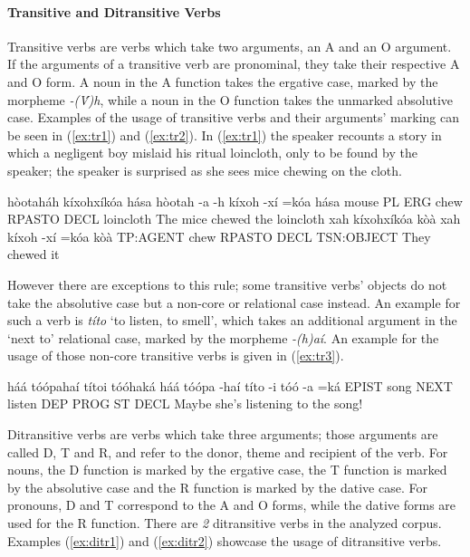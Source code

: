 \documentclass[a4paper, 12pt, oneside]{memoir}
\newcommand{\emh}[1]{\textit{#1}}
\begin{document}
\paragraph{Transitive and Ditransitive Verbs}\label{s:trans}
Transitive verbs are verbs which take two arguments, an A and an O argument. If the arguments of a transitive verb are pronominal, they take their respective A and O form. A noun in the A function takes the ergative case, marked by the morpheme \emh{-(V́)h}, while a noun in the O function takes the unmarked absolutive case. Examples of the usage of transitive verbs and their arguments' marking can be seen in (\ref{ex:tr1}) and (\ref{ex:tr2}). In (\ref{ex:tr1}) the speaker recounts a story in which a negligent boy mislaid his ritual loincloth, only to be found by the speaker; the speaker is surprised as she sees mice chewing on the cloth.
\begin{examples}
    \ex \label{ex:tr1}
    \words hòotaháh kíxohxíkóa hása
    \bits hòotah -a -h kíxoh -xí =kóa hása 
    \gloss mouse PL ERG chew RPASTO DECL loincloth
    \tr The mice chewed the loincloth
    \ex \label{ex:tr2}
    \words xah kíxohxíkóa kòà
    \bits xah kíxoh -xí =kóa kòà
    \gloss TP:AGENT chew RPASTO DECL TSN:OBJECT
    \tr They chewed it
\end{examples} 
However there are exceptions to this rule; some transitive verbs' objects do not take the absolutive case but a non-core or relational case instead. An example for such a verb is \emh{títo} `to listen, to smell', which takes an additional argument in the `next to' relational case, marked by the morpheme \emh{-(h)aí}. An example for the usage of those non-core transitive verbs is given in (\ref{ex:tr3}).
\begin{examples}
    \ex \label{ex:tr3}
    \words háá tóópahaí títoi tóóhaká
    \bits háá tóópa -haí títo -i tóó -a =ká 
    \gloss EPIST song NEXT listen DEP PROG ST DECL
    \tr Maybe she's listening to the song!
\end{examples}
Ditransitive verbs are verbs which take three arguments; those arguments are called D, T and R, and refer to the donor, theme and recipient of the verb. For nouns, the D function is marked by the ergative case, the T function is marked by the absolutive case and the R function is marked by the dative case. For pronouns, D and T correspond to the A and O forms, while the dative forms are used for the R function. There are \textit{2} ditransitive verbs in the analyzed corpus. Examples (\ref{ex:ditr1}) and (\ref{ex:ditr2}) showcase the usage of ditransitive verbs. 
\end{document}
